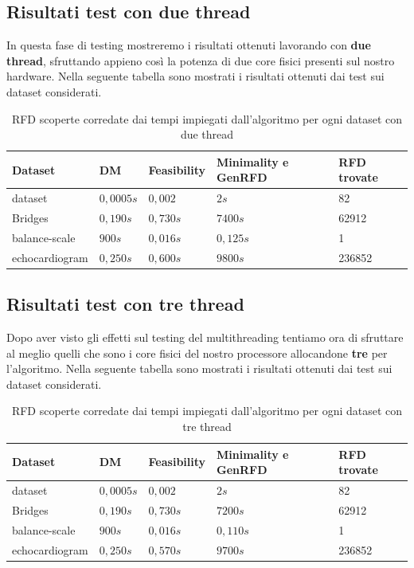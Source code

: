 \subsection{Risultati test con due thread}
In questa fase di testing mostreremo i risultati ottenuti lavorando con \textbf{due thread}, sfruttando appieno così la potenza di due core fisici presenti sul nostro hardware.
Nella seguente tabella sono mostrati i risultati ottenuti dai test sui dataset considerati.
\begin{table}[H]
	\centering
	\begin{tabular}{lllll}
		Dataset & DM & Feasibility & Minimality e GenRFD & RFD trovate \\
		\hline
		dataset& $0,0005s$ & $0,002$ & $2s$ & 82 \\
		Bridges & $0,190s$  & $0,730s$ & $7400s$ & 62912 \\
		balance-scale  & $900s$  & $0,016s$ & $0,125s$ & 1\\
		echocardiogram  & $0,250s$  & $0,600s$ & $9800s$ & 236852\\
		\hline
	\end{tabular}
	\label{risultati_2_thread}
	\caption{RFD scoperte corredate dai tempi impiegati dall'algoritmo per ogni dataset con due thread}
\end{table}
\subsection{Risultati test con tre thread}
Dopo aver visto gli effetti sul testing del multithreading tentiamo ora di sfruttare al meglio quelli che sono i core fisici del nostro processore allocandone \textbf{tre} per l'algoritmo.
Nella seguente tabella sono mostrati i risultati ottenuti dai test sui dataset considerati.
\begin{table}[H]
	\centering
	\begin{tabular}{lllll}
		Dataset & DM & Feasibility & Minimality e GenRFD & RFD trovate \\
		\hline
		dataset& $0,0005s$ & $0,002$ & $2s$ & 82 \\
		Bridges & $0,190s$  & $0,730s$ & $7200s$ & 62912 \\
		balance-scale  & $900s$  & $0,016s$ & $0,110s$ & 1\\
		echocardiogram  & $0,250s$  & $0,570s$ & $9700s$ & 236852\\
		\hline
	\end{tabular}
	\label{risultati_3_thread}
	\caption{RFD scoperte corredate dai tempi impiegati dall'algoritmo per ogni dataset con tre thread}
\end{table}
